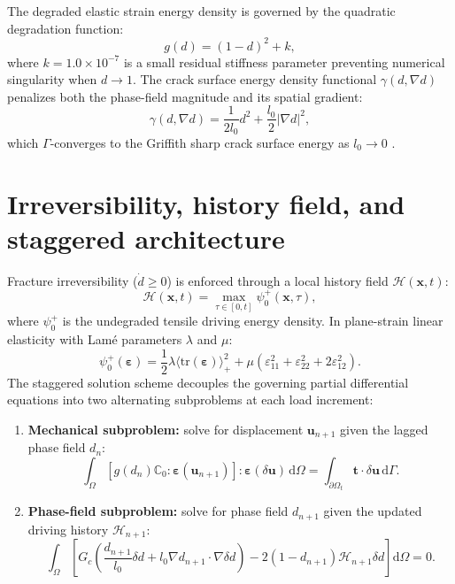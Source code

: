 The degraded elastic strain energy density is governed by the quadratic degradation function:
\begin{equation}
g(d)=(1-d)^2+k,
\label{eq:degradation}
\end{equation}
where $k=1.0\times10^{-7}$ is a small residual stiffness parameter preventing numerical singularity when $d\rightarrow1$. The crack surface energy density functional $\gamma(d,\nabla d)$ penalizes both the phase-field magnitude and its spatial gradient:
\begin{equation}
\gamma(d,\nabla d) = \frac{1}{2l_0}d^2 + \frac{l_0}{2}\lvert\nabla d\rvert^2,
\label{eq:crack_surface_density}
\end{equation}
which $\Gamma$-converges to the Griffith sharp crack surface energy as $l_0\rightarrow0$ \citep{bourdin2008}.

\section{Irreversibility, history field, and staggered architecture}

Fracture irreversibility ($\dot{d}\ge0$) is enforced through a local history field $\mathcal{H}(\mathbf{x},t)$:
\begin{equation}
\mathcal{H}(\mathbf{x},t)=\max_{\tau\in[0,t]}\psi_0^{+}(\mathbf{x},\tau),
\label{eq:history}
\end{equation}
where $\psi_0^{+}$ is the undegraded tensile driving energy density. In plane-strain linear elasticity with Lam\'e parameters $\lambda$ and $\mu$:
\begin{equation}
\psi_0^{+}(\boldsymbol{\varepsilon}) = \frac{1}{2}\lambda \langle \mathrm{tr}(\boldsymbol{\varepsilon}) \rangle_+^2 + \mu \left(\varepsilon_{11}^2 + \varepsilon_{22}^2 + 2\varepsilon_{12}^2\right).
\end{equation}
The staggered solution scheme decouples the governing partial differential equations into two alternating subproblems at each load increment:
\begin{enumerate}
  \item \textbf{Mechanical subproblem:} solve for displacement $\mathbf{u}_{n+1}$ given the lagged phase field $d_n$:
  \begin{equation}
  \int_{\Omega} \left[ g(d_n) \mathbb{C}_0 : \boldsymbol{\varepsilon}(\mathbf{u}_{n+1}) \right] : \boldsymbol{\varepsilon}(\delta\mathbf{u})\,\mathrm{d}\Omega = \int_{\partial\Omega_t} \mathbf{t}\cdot\delta\mathbf{u}\,\mathrm{d}\Gamma.
  \end{equation}
  \item \textbf{Phase-field subproblem:} solve for phase field $d_{n+1}$ given the updated driving history $\mathcal{H}_{n+1}$:
  \begin{equation}
  \int_{\Omega} \left[ G_c\left(\frac{d_{n+1}}{l_0}\delta d + l_0 \nabla d_{n+1}\cdot\nabla\delta d\right) - 2(1-d_{n+1})\mathcal{H}_{n+1}\delta d \right]\mathrm{d}\Omega = 0.
  \end{equation}
\end{enumerate}

